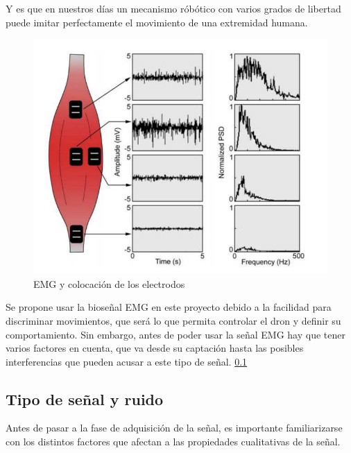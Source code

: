 Y es que en nuestros días un mecanismo róbótico con varios grados de libertad puede imitar perfectamente el movimiento de una extremidad humana. 

\begin{figure}[H]
	\center
	\includegraphics[scale=0.7]{imagenes/EstadodelArte/EMG.png}
	\caption{EMG y colocación de los electrodos}
	\label{fig:EMG}
\end{figure}

Se propone usar la bioseñal EMG en este proyecto debido a la facilidad para discriminar movimientos, que será lo que permita controlar el dron y definir su comportamiento. Sin embargo, antes de poder usar la señal EMG hay que tener varios factores en cuenta, que va desde su captación hasta las posibles interferencias que pueden acusar a este tipo de señal. \ref{sec:Ruido}

\subsection{Tipo de señal y ruido}\label{sec:Ruido}

Antes de pasar a la fase de adquisición de la señal, es importante familiarizarse con los distintos factores que afectan a las propiedades cualitativas de la señal.\newline

